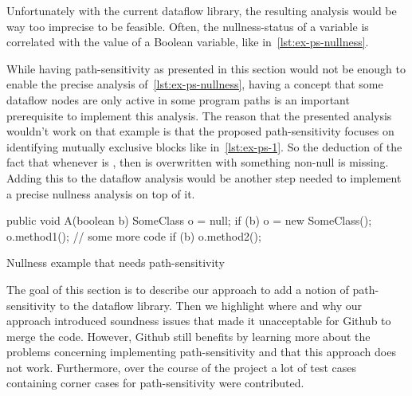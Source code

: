 Unfortunately with the current dataflow library, the resulting analysis would 
be way too imprecise to be feasible.
Often, the nullness-status of a variable is correlated with the value of a Boolean 
variable, like in~\autoref{lst:ex-ps-nullness}.

While having path-sensitivity as presented in this section would not be enough 
to enable the precise analysis of~\autoref{lst:ex-ps-nullness},
having a concept that some dataflow nodes are only active in some program paths 
is an important prerequisite to implement this analysis.
The reason that the presented analysis wouldn't work on that example is that
the proposed path-sensitivity focuses on identifying mutually exclusive 
blocks like in~\autoref{lst:ex-ps-1}.
So the deduction of the fact that whenever  is ,
then  is overwritten with something non-null is missing.
Adding this to the dataflow analysis would be another step needed to 
implement a precise nullness analysis on top of it.

\begin{listing}[h]
    \begin{javacode}
public void A(boolean b) {
    SomeClass o = null;
    if (b) {
        o = new SomeClass();
        o.method1();
    }
    // some more code
    if (b) {
        o.method2();
    }
}
    \end{javacode}
    \caption{Nullness example that needs path-sensitivity}
    \label{lst:ex-ps-nullness}
\end{listing}


The goal of this section is to describe our approach to add a notion of
path-sensitivity to the dataflow library.
Then we highlight where and why our approach introduced soundness issues
that made it unacceptable for Github to merge the code.
However, Github still benefits by learning more about the problems
concerning implementing path-sensitivity and that this approach does not work.
Furthermore, over the course of the project a lot of test cases containing
corner cases for path-sensitivity were contributed.



